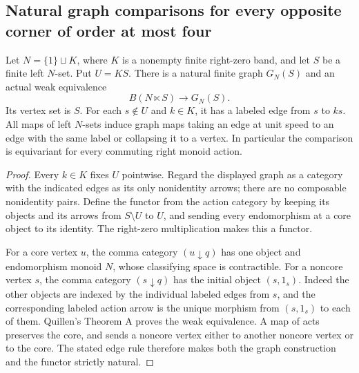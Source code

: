 \subsection{Natural graph comparisons for every opposite corner of order at most four}

\begin{lemma}
\label{C:right-zero-band-natural-graph}
Let $N=\{1\}\sqcup K$, where $K$ is a nonempty finite right-zero
band, and let $S$ be a finite left $N$-set.  Put $U=KS$.
There is a natural finite graph $G_N(S)$ and an actual weak
equivalence
\[
 B(N\ltimes S)\longrightarrow G_N(S).
\]
Its vertex set is $S$.  For each $s\notin U$ and $k\in K$,
it has a labeled edge from $s$ to $ks$.  All maps of left
$N$-sets induce graph maps taking an edge at unit speed to an
edge with the same label or collapsing it to a vertex.
In particular the comparison is equivariant for every commuting
right monoid action.
\end{lemma}
\begin{proof}
Every $k\in K$ fixes $U$ pointwise.  Regard the displayed graph
as a category with the indicated edges as its only nonidentity
arrows; there are no composable nonidentity pairs.  Define the
functor from the action category by keeping its objects and
its arrows from $S\setminus U$ to $U$, and sending every
endomorphism at a core object to its identity.  The right-zero
multiplication makes this a functor.

For a core vertex $u$, the comma category $(u\downarrow q)$
has one object and endomorphism monoid $N$, whose classifying
space is contractible.  For a noncore vertex $s$, the comma
category $(s\downarrow q)$ has the initial object $(s,1_s)$.
Indeed the other objects are indexed by the individual labeled
edges from $s$, and the corresponding labeled action arrow is
the unique morphism from $(s,1_s)$ to each of them.  Quillen's
Theorem A proves the weak equivalence.  A map of acts preserves
the core, and sends a noncore vertex either to another noncore
vertex or to the core.  The stated edge rule therefore makes
both the graph construction and the functor strictly natural.
\end{proof}

